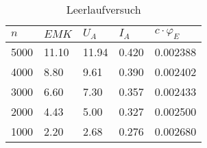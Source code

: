 \begin{table}[htbp]
    \centering
    \begin{tabularx}{\columnwidth}{XXXXX}
        \toprule
        $n$  & $EMK$ & $U_A$ & $I_A$ & $c\cdot\varphi_E$ \\
        \midrule
        5000 & 11.10 & 11.94 & 0.420 & 0.002388          \\
        4000 & 8.80  & 9.61  & 0.390 & 0.002402          \\
        3000 & 6.60  & 7.30  & 0.357 & 0.002433          \\
        2000 & 4.43  & 5.00  & 0.327 & 0.002500          \\
        1000 & 2.20  & 2.68  & 0.276 & 0.002680          \\
        \bottomrule
    \end{tabularx}
    \caption{Leerlaufversuch}
\end{table}


